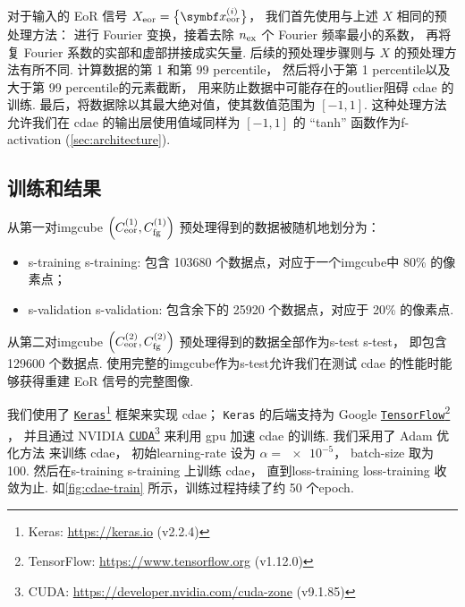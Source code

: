 对于输入的 EoR 信号 $X_{\R{eor}} = \big\{ \B{x}^{(i)}_{\R{eor}} \big\}$，
我们首先使用与上述 $X$ 相同的预处理方法：
进行 Fourier 变换，接着去除 $n_{\mathrm{ex}}$ 个 Fourier 频率最小的系数，
再将复 Fourier 系数的实部和虚部拼接成实矢量.
后续的预处理步骤则与 $X$ 的预处理方法有所不同.
计算数据的第 1 和第 99 \ac{percentile}，
然后将小于第 1 \ac{percentile}以及大于第 99 \ac{percentile}的元素截断，
用来防止数据中可能存在的\ac{outlier}阻碍 \ac{cdae} 的训练.
最后，将数据除以其最大绝对值，使其数值范围为 $[-1, 1]$.
这种处理方法允许我们在 \ac{cdae} 的输出层使用值域同样为 $[-1, 1]$
的 \enquote{tanh} 函数作为\ac{f-activation} (\autoref{sec:architecture}).

\subsection{训练和结果}
\label{sec:cdae-results}

从第一对\ac{imgcube}
$\left( C_{\mathrm{eor}}^{(1)}, C_{\mathrm{fg}}^{(1)} \right)$
预处理得到的数据被随机地划分为：
\begin{itemize}
  \item \acl{s-training} \ac{s-training}:
    包含 \num{103680} 个数据点，对应于一个\ac{imgcube}中 80\% 的像素点；
  \item \acl{s-validation} \ac{s-validation}:
    包含余下的 \num{25920} 个数据点，对应于 20\% 的像素点.
\end{itemize}
从第二对\ac{imgcube}
$\left( C_{\mathrm{eor}}^{(2)}, C_{\mathrm{fg}}^{(2)} \right)$
预处理得到的数据全部作为\acl{s-test} \ac{s-test}，
即包含 \num{129600} 个数据点.
使用完整的\ac{imgcube}作为\acl{s-test}允许我们在测试 \ac{cdae}
的性能时能够获得重建 EoR 信号的完整图像.

我们使用了 \href{https://keras.io}{\texttt{Keras}}\footnote{%
  Keras: \url{https://keras.io} (v2.2.4)}
框架\cite{keras}来实现 \ac{cdae}；
\texttt{Keras} 的后端支持为 Google
\href{https://www.tensorflow.org}{\texttt{TensorFlow}}\footnote{%
  TensorFlow: \url{https://www.tensorflow.org} (v1.12.0)}
\cite{tensorflow}，
并且通过 NVIDIA
\href{https://developer.nvidia.com/cuda-zone}{\texttt{CUDA}}\footnote{%
  CUDA: \url{https://developer.nvidia.com/cuda-zone} (v9.1.85)}
来利用 \ac{gpu} 加速 \ac{cdae} 的训练.
我们采用了 Adam 优化方法\cite{kingma2015} 来训练 \ac{cdae}，
初始\ac{learning-rate} 设为 $\alpha = \num{e-5}$，
\ac{batch-size} 取为 100.
然后在\acl{s-training} \ac{s-training} 上训练 \ac{cdae}，
直到\acl{loss-training} \ac{loss-training} 收敛为止.
如\autoref{fig:cdae-train} 所示，训练过程持续了约 50 个\ac{epoch}.

